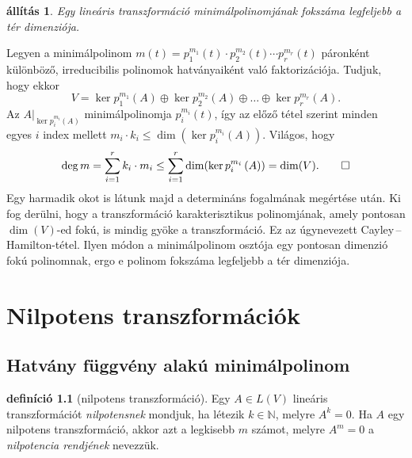\documentclass[a4paper, showtrims]{memoir}
\makeatletter
\renewenvironment{proof}[1][\proofname]
    {\par\pushQED{\qed}%
    \normalfont \topsep6\p@\@plus6\p@\relax
    \trivlist
    \item[\hskip\labelsep
        \itshape
    #1\@addpunct{:}]\ignorespaces}
    {\popQED\endtrivlist\@endpefalse}
\theoremstyle{plain}
\newtheorem{proposition}{állítás}[chapter]
\theoremstyle{remark}
\theoremstyle{definition}
\newtheorem{definition}[proposition]{definíció}
\makeatother
\begin{document}
\begin{proposition}
	Egy lineáris transzformáció minimálpolinomjának fokszáma legfeljebb a tér dimenziója.
	\label{th:minpol}
\end{proposition}
\begin{proof}
	Legyen a minimálpolinom
	$
		m\left( t \right)
		=
		p_1^{m_1}\left( t \right)\cdot
		p_2^{m_2}\left( t \right)\cdots
		p_r^{m_r}\left( t \right)
	$
	páronként különböző, irreducibilis polinomok hatványaiként való faktorizációja.
	Tudjuk, hogy ekkor
	\[
		V
		=
		\ker p_1^{m_1}\left( A \right)
		\oplus
		\ker p_2^{m_2}\left( A \right)
		\oplus\dots\oplus
		\ker p_r^{m_r}\left( A \right).
	\]
	Az $A|_{\ker p_i^{m_i}\left( A \right)}$ minimálpolinomja $p_i^{m_i}\left( t \right)$, így az előző tétel szerint minden egyes $i$ index mellett
	$
		m_i\cdot k_i\leq \dim(\ker p_i^{m_i}\left( A \right)).
	$
	Világos, hogy
	\[
		\deg m
		=
		\sum_{i=1}^rk_i\cdot m_i
		\leq
		\sum_{i=1}^r\dim(\ker p_i^{m_i}\left( A \right))
		=
		\dim(V).\qedhere
	\]
\end{proof}
Egy harmadik okot is látunk majd a determináns fogalmának megértése után.
Ki fog derülni,
hogy a transzformáció karakterisztikus polinomjának, amely pontosan $\dim(V)$-ed fokú,
is mindig gyöke a transzformáció.
Ez az úgynevezett Cayley\,--\,Hamilton-tétel.
Ilyen módon a minimálpolinom osztója egy pontosan dimenzió fokú polinomnak, 
ergo e polinom fokszáma legfeljebb a tér dimenziója.
\chapter{Nilpotens transzformációk}
\section{Hatvány függvény alakú minimálpolinom}
\begin{definition}[nilpotens transzformáció]
	Egy $A\in L\left( V \right)$ lineáris transzformációt
	\emph{nilpotensnek} mondjuk, ha
	létezik $k\in\mathbb{N}$, melyre $A^k=0$.
	Ha $A$ egy nilpotens transzformáció, akkor azt a legkisebb $m$ számot, melyre $A^m=0$ a \emph{nilpotencia rendjének} nevezzük.
\end{definition}
\end{document}
